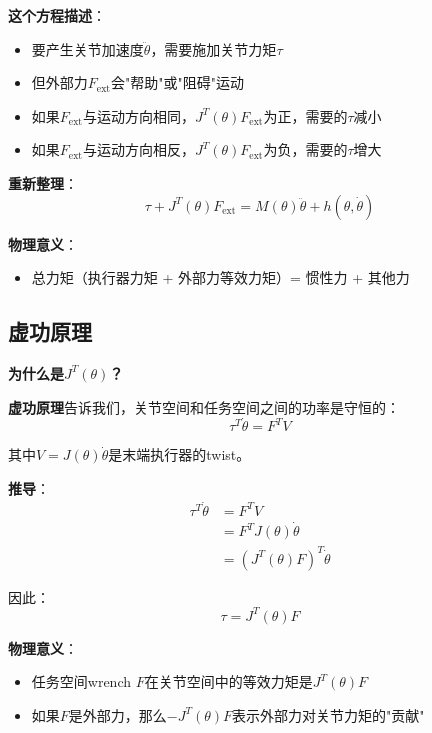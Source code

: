 \documentclass[12pt,a4paper]{article}
\begin{document}
\textbf{这个方程描述}：
\begin{itemize}
\item 要产生关节加速度$\ddot{\theta}$，需要施加关节力矩$\tau$
\item 但外部力$F_{\text{ext}}$会"帮助"或"阻碍"运动
\item 如果$F_{\text{ext}}$与运动方向相同，$J^T(\theta)F_{\text{ext}}$为正，需要的$\tau$减小
\item 如果$F_{\text{ext}}$与运动方向相反，$J^T(\theta)F_{\text{ext}}$为负，需要的$\tau$增大
\end{itemize}

\textbf{重新整理}：
\begin{equation}
\tau + J^T(\theta)F_{\text{ext}} = M(\theta)\ddot{\theta} + h(\theta, \dot{\theta})
\end{equation}

\textbf{物理意义}：
\begin{itemize}
\item 总力矩（执行器力矩 + 外部力等效力矩）= 惯性力 + 其他力
\end{itemize}

\subsection{虚功原理}

\textbf{为什么是$J^T(\theta)$？}

\textbf{虚功原理}告诉我们，关节空间和任务空间之间的功率是守恒的：
\begin{equation}
\tau^T\dot{\theta} = F^T V
\end{equation}

其中$V = J(\theta)\dot{\theta}$是末端执行器的twist。

\textbf{推导}：
\begin{align}
\tau^T\dot{\theta} &= F^T V \\
&= F^T J(\theta)\dot{\theta} \\
&= (J^T(\theta)F)^T\dot{\theta}
\end{align}

因此：
\begin{equation}
\tau = J^T(\theta)F
\end{equation}

\textbf{物理意义}：
\begin{itemize}
\item 任务空间wrench $F$在关节空间中的等效力矩是$J^T(\theta)F$
\item 如果$F$是外部力，那么$-J^T(\theta)F$表示外部力对关节力矩的"贡献"
\end{itemize}
\end{document}
